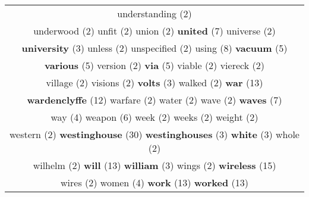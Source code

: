 \documentclass[12pt,a4paper]{article}
\begin{document}
\begin{center}
\begin{longtable}{|c|}
{\footnotesize \textcolor{Verde} {understanding}} \footnotesize{(2)}  \\ {\footnotesize \textcolor{Verde} {underwood}} \footnotesize{(2)} {\footnotesize \textcolor{Verde} {unfit}} \footnotesize{(2)} {\footnotesize \textcolor{Verde} {union}} \footnotesize{(2)} {\LARGE \textcolor{Rosa} {\bf united}} \footnotesize{(7)} {\footnotesize \textcolor{Verde} {universe}} \footnotesize{(2)}  \\ {\small \textcolor{Laranja} {\bf university}} \footnotesize{(3)} {\footnotesize \textcolor{Verde} {unless}} \footnotesize{(2)} {\footnotesize \textcolor{Verde} {unspecified}} \footnotesize{(2)} {\huge \textcolor{Amarelo} {using}} \footnotesize{(8)} {\large \textcolor{Roxo} {\bf vacuum}} \footnotesize{(5)}  \\ {\large \textcolor{Roxo} {\bf various}} \footnotesize{(5)} {\footnotesize \textcolor{Verde} {version}} \footnotesize{(2)} {\large \textcolor{Roxo} {\bf via}} \footnotesize{(5)} {\footnotesize \textcolor{Verde} {viable}} \footnotesize{(2)} {\footnotesize \textcolor{Verde} {viereck}} \footnotesize{(2)}  \\ {\footnotesize \textcolor{Verde} {village}} \footnotesize{(2)} {\footnotesize \textcolor{Verde} {visions}} \footnotesize{(2)} {\small \textcolor{Laranja} {\bf volts}} \footnotesize{(3)} {\footnotesize \textcolor{Verde} {walked}} \footnotesize{(2)} {\Huge \textcolor{AzulEscuro} {\bf war}} \footnotesize{(13)}  \\ {\Huge \textcolor{AzulEscuro} {\bf wardenclyffe}} \footnotesize{(12)} {\footnotesize \textcolor{Verde} {warfare}} \footnotesize{(2)} {\footnotesize \textcolor{Verde} {water}} \footnotesize{(2)} {\footnotesize \textcolor{Verde} {wave}} \footnotesize{(2)} {\LARGE \textcolor{Rosa} {\bf waves}} \footnotesize{(7)}  \\ {\normalsize \textcolor{VerdeLocao} {way}} \footnotesize{(4)} {\Large \textcolor{VermEscuro} {weapon}} \footnotesize{(6)} {\footnotesize \textcolor{Verde} {week}} \footnotesize{(2)} {\footnotesize \textcolor{Verde} {weeks}} \footnotesize{(2)} {\footnotesize \textcolor{Verde} {weight}} \footnotesize{(2)}  \\ {\footnotesize \textcolor{Verde} {western}} \footnotesize{(2)} {\Huge \textcolor{AzulEscuro} {\bf westinghouse}} \footnotesize{(30)} {\small \textcolor{Laranja} {\bf westinghouses}} \footnotesize{(3)} {\small \textcolor{Laranja} {\bf white}} \footnotesize{(3)} {\footnotesize \textcolor{Verde} {whole}} \footnotesize{(2)}  \\ {\footnotesize \textcolor{Verde} {wilhelm}} \footnotesize{(2)} {\Huge \textcolor{AzulEscuro} {\bf will}} \footnotesize{(13)} {\small \textcolor{Laranja} {\bf william}} \footnotesize{(3)} {\footnotesize \textcolor{Verde} {wings}} \footnotesize{(2)} {\Huge \textcolor{AzulEscuro} {\bf wireless}} \footnotesize{(15)}  \\ {\footnotesize \textcolor{Verde} {wires}} \footnotesize{(2)} {\normalsize \textcolor{VerdeLocao} {women}} \footnotesize{(4)} {\Huge \textcolor{AzulEscuro} {\bf work}} \footnotesize{(13)} {\Huge \textcolor{AzulEscuro} {\bf worked}} \footnotesize{(13)} {\huge 
\end{longtable}
\end{center}
\end{document}
